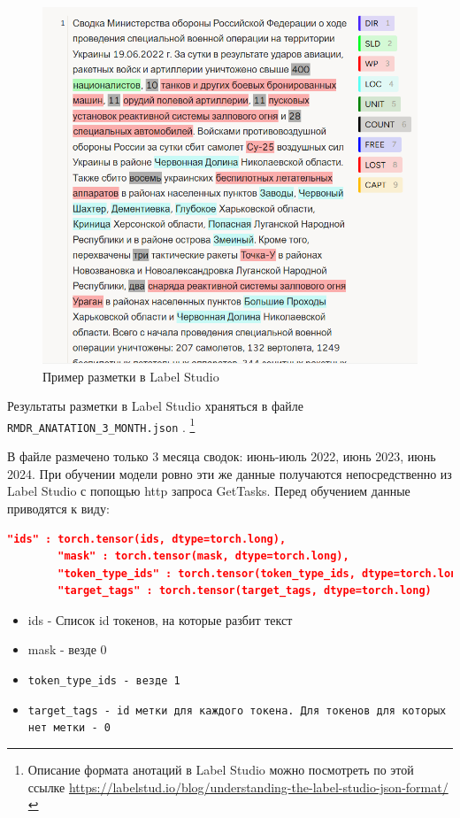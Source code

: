 \documentclass{article}
\begin{document}
\begin{figure}[H]
    \centering
    \includegraphics[width=0.9\linewidth]{images/Labal Studio Example.png}
    \caption{Пример разметки в Label Studio}
    \label{fig:enter-label}
\end{figure}

Результаты разметки в Label Studio храняться в файле \verb|RMDR_ANATATION_3_MONTH.json| . 
\footnote{Описание формата анотаций в Label Studio можно посмотреть по этой ссылке \cite{LSJF} \url{https://labelstud.io/blog/understanding-the-label-studio-json-format/}}

В файле размечено только 3 месяца сводок: июнь-июль 2022, июнь 2023, июнь 2024.
При обучении модели ровно эти же данные получаются непосредственно из Label Studio с попощью http запроса GetTasks. Перед обучением данные приводятся к виду:

\begin{lstlisting}[language=json]
        "ids" : torch.tensor(ids, dtype=torch.long),
        "mask" : torch.tensor(mask, dtype=torch.long),
        "token_type_ids" : torch.tensor(token_type_ids, dtype=torch.long),
        "target_tags" : torch.tensor(target_tags, dtype=torch.long)
\end{lstlisting}

\begin{itemize}
  \item ids - Список id токенов, на которые разбит текст
  \item mask - везде 0
  \item \verb|token_type_ids - везде 1| 
  \item \verb|target_tags - id метки для каждого токена. Для токенов для которых нет метки - 0|
\end{itemize}
\end{document}
